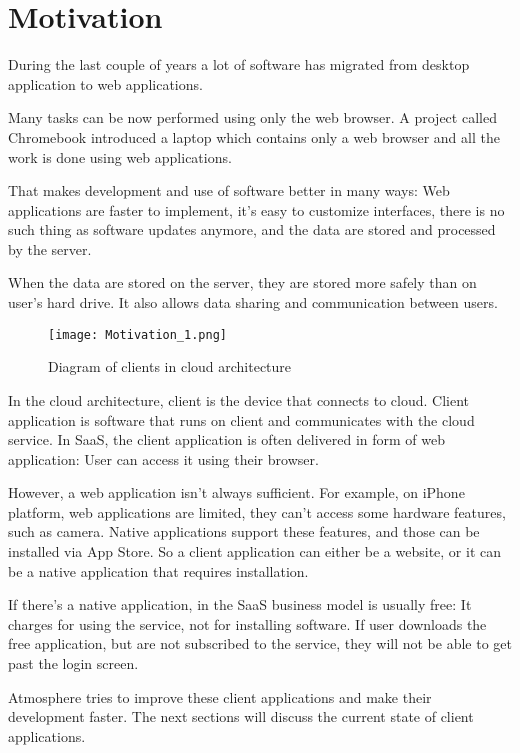 \section{Motivation}

During the last couple of years a lot of software has migrated from desktop application to web applications.

Many tasks can be now performed using only the web browser. A project called Chromebook \citep{chromebook} introduced a laptop which contains only a web browser and all the work is done using web applications.

That makes development and use of software better in many ways: Web applications are faster to implement, it’s easy to customize interfaces, there is no such thing as software updates anymore, and the data are stored and processed by the server.

When the data are stored on the server, they are stored more safely than on user's hard drive. It also allows data sharing and communication between users.

\begin{figure}[ht!]
\centering
\texttt{[image: Motivation\_1.png]}
\caption{Diagram of clients in cloud architecture \label{fig:1}}
\end{figure}

In the cloud architecture, client is the device that connects to cloud. Client application is software that runs on client and communicates with the cloud service. In SaaS, the client application is often delivered in form of web application: User can access it using their browser.

However, a web application isn't always sufficient. For example, on iPhone platform, web applications are limited, they can’t access some hardware features, such as camera. Native applications support these features, and those can be installed via App Store. So a client application can either be a website, or it can be a native application that requires installation.

If there's a native application, in the SaaS business model is usually free: It charges for using the service, not for installing software. If user downloads the free application, but are not subscribed to the service, they will not be able to get past the login screen. 

Atmosphere tries to improve these client applications and make their development faster. The next sections will discuss the current state of client applications.

